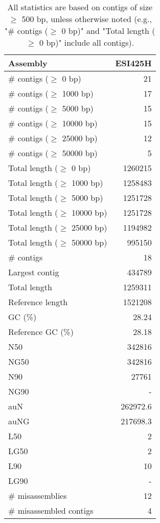 \documentclass[12pt,a4paper]{article}
\begin{document}
\begin{table}[ht]
\begin{center}
\caption{All statistics are based on contigs of size $\geq$ 500 bp, unless otherwise noted (e.g., "\# contigs ($\geq$ 0 bp)" and "Total length ($\geq$ 0 bp)" include all contigs).}
\begin{tabular}{|l*{1}{|r}|}
\hline
Assembly & ESI425H \\ \hline
\# contigs ($\geq$ 0 bp) & 21 \\ \hline
\# contigs ($\geq$ 1000 bp) & 17 \\ \hline
\# contigs ($\geq$ 5000 bp) & 15 \\ \hline
\# contigs ($\geq$ 10000 bp) & 15 \\ \hline
\# contigs ($\geq$ 25000 bp) & 12 \\ \hline
\# contigs ($\geq$ 50000 bp) & 5 \\ \hline
Total length ($\geq$ 0 bp) & 1260215 \\ \hline
Total length ($\geq$ 1000 bp) & 1258483 \\ \hline
Total length ($\geq$ 5000 bp) & 1251728 \\ \hline
Total length ($\geq$ 10000 bp) & 1251728 \\ \hline
Total length ($\geq$ 25000 bp) & 1194982 \\ \hline
Total length ($\geq$ 50000 bp) & 995150 \\ \hline
\# contigs & 18 \\ \hline
Largest contig & 434789 \\ \hline
Total length & 1259311 \\ \hline
Reference length & 1521208 \\ \hline
GC (\%) & 28.24 \\ \hline
Reference GC (\%) & 28.18 \\ \hline
N50 & 342816 \\ \hline
NG50 & 342816 \\ \hline
N90 & 27761 \\ \hline
NG90 & - \\ \hline
auN & 262972.6 \\ \hline
auNG & 217698.3 \\ \hline
L50 & 2 \\ \hline
LG50 & 2 \\ \hline
L90 & 10 \\ \hline
LG90 & - \\ \hline
\# misassemblies & 12 \\ \hline
\# misassembled contigs & 4 \\ \hline

\end{tabular}
\end{center}
\end{table}
\end{document}
